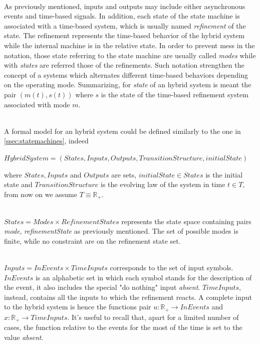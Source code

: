 \paragraph{} As previously mentioned, inputs and outputs may include either asynchronous events and time-based signals. In addition, each state of the state machine is associated with a time-based system, which is usually named \textit{refinement} of the state. The refinement represents the time-based behavior of the hybrid system while the internal machine is in the relative state. In order to prevent mess in the notation, those state referring to the state machine are usually called \textit{modes} while with \textit{states} are referred those of the refinements. Such notation strengthen the concept of a systems which alternates different time-based behaviors depending on the operating mode. Summarizing, for \textit{state} of an hybrid system is meant the pair $(m(t),s(t))$ where $s$ is the state of the time-based refinement system associated with mode $m$.

\noindent 
\\
A formal model for an hybrid system could be defined similarly to the one in \ref{ssec:statemachines}, indeed
\begin{center}
$HybridSystem = (States, Inputs, Outputs, TransitionStructure, initialState)$
\end{center}
where $States, Inputs$ and $Outputs$ are sets, $initialState \in States$ is the initial state and $TransitionStructure$ is the evolving law of the system in time $t \in T$, from now on we assume $T \equiv \mathbb{R}_{+}$.

\noindent
\\
$States = Modes \times RefinementStates$ represents the state space containing pairs \textit{mode}, \textit{refinementState} as previously mentioned. The set of possible modes is finite, while no constraint are on the refinement state set. 

\noindent
\\
$Inputs = InEvents \times TimeInputs$ corresponds to the set of input symbols. $InEvents$ is an alphabetic set in which each symbol stands for the description of the event, it also includes the special "do nothing" input \textit{absent}. $TimeInputs$, instead, contains all the inputs to which the refinement reacts. A complete input to the hybrid system is hence the functions pair $u:\mathbb{R}_{+}\rightarrow InEvents$ and $x:\mathbb{R}_{+}\rightarrow TimeInputs$. It's useful to recall that, apart for a limited number of cases, the function relative to the events for the most of the time is set to the value \textit{absent}.

